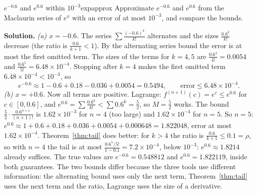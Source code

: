 \documentclass[11pt]{article}
\begin{document}
\begin{exmp}{$e^{-0.6}$ and $e^{0.6}$ within $10^{-3}$}{expapprox}
Approximate $e^{-0.6}$ and $e^{0.6}$ from the Maclaurin series of $e^x$ with an error of at most $10^{-3}$, and compare the bounds.

\textbf{Solution.} \emph{(a) $x=-0.6$.} The series $\sum\frac{(-0.6)^k}{k!}$ alternates and the sizes $\frac{0.6^k}{k!}$ decrease (the ratio is $\frac{0.6}{k+1}<1$). By the alternating series bound the error is at most the first omitted term. The sizes of the terms for $k=4,5$ are $\frac{0.6^4}{4!}=0.0054$ and $\frac{0.6^5}{5!}=6.48\times10^{-4}$. Stopping after $k=4$ makes the first omitted term $6.48\times10^{-4}<10^{-3}$, so
\[
e^{-0.6}\approx1-0.6+0.18-0.036+0.0054=0.5494,\qquad\text{error}\le6.48\times10^{-4}.
\]
\emph{(b) $x=+0.6$.} Now all terms are positive. Lagrange: $f^{(n+1)}(c)=e^c\le e^{0.6}$ for $c\in[0,0.6]$, and $e^{0.6}=\sum\frac{0.6^k}{k!}<\sum0.6^k=\frac52$, so $M=\frac52$ works. The bound $\frac52\cdot\frac{0.6^{n+1}}{(n+1)!}$ is $1.62\times10^{-3}$ for $n=4$ (too large) and $1.62\times10^{-4}$ for $n=5$. So $n=5$: $e^{0.6}\approx1+0.6+0.18+0.036+0.0054+0.000648=1.822048$, error at most $1.62\times10^{-4}$. Theorem~\ref{thm:tail} does better: for $k>4$ the ratio is $\frac{0.6}{k+1}\le0.1=\rho$, so with $n=4$ the tail is at most $\frac{0.6^5/5!}{1-0.1}=7.2\times10^{-4}$, below $10^{-3}$: $e^{0.6}\approx1.8214$ already suffices.
The true values are $e^{-0.6}=0.548812$ and $e^{0.6}=1.822119$, inside both guarantees. The two bounds differ because the three tools use different information: the alternating bound uses only the next term, Theorem~\ref{thm:tail} uses the next term and the ratio, Lagrange uses the size of a derivative.
\end{exmp}
\end{document}
